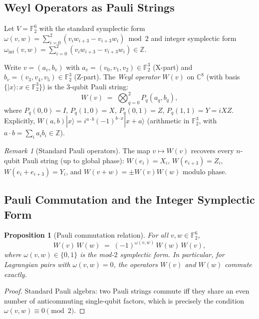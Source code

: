 \documentclass[11pt,a4paper]{article}
\newtheorem{proposition}[theorem]{Proposition}
\theoremstyle{remark}
\newtheorem{remark}[theorem]{Remark}
\begin{document}
\subsection{Weyl Operators as Pauli Strings}

Let $V = \mathbb{F}_2^6$ with the standard symplectic form
$\omega(v,w) = \sum_{i=0}^2 (v_i w_{i+3} - v_{i+3} w_i) \bmod 2$
and integer symplectic form
$\omega_{\mathrm{int}}(v,w) = \sum_{i=0}^2 (v_i w_{i+3} - v_{i+3} w_i) \in \mathbb{Z}$.

Write $v = (a_v, b_v)$ with $a_v = (v_0,v_1,v_2) \in \mathbb{F}_2^3$ (X-part)
and $b_v = (v_3,v_4,v_5) \in \mathbb{F}_2^3$ (Z-part).
The \emph{Weyl operator} $W(v)$ on $\mathbb{C}^8$
(with basis $\{|x\rangle : x \in \mathbb{F}_2^3\}$) is the
3-qubit Pauli string:
\[
  W(v) \;=\; \bigotimes_{q=0}^{2} P_q(a_q, b_q),
\]
where $P_q(0,0) = I$, $P_q(1,0) = X$, $P_q(0,1) = Z$,
$P_q(1,1) = Y = iXZ$.
Explicitly, $W(a,b)|x\rangle = i^{a \cdot b}(-1)^{b \cdot x}|x+a\rangle$
(arithmetic in $\mathbb{F}_2^3$, with $a \cdot b = \sum_i a_i b_i \in \mathbb{Z}$).

\begin{remark}[Standard Pauli operators]
The map $v \mapsto W(v)$ recovers every $n$-qubit Pauli string
(up to global phase):
$W(e_i) = X_i$, $W(e_{i+3}) = Z_i$, $W(e_i + e_{i+3}) = Y_i$,
and $W(v+w) = \pm W(v)W(w)$ modulo phase.
\end{remark}

\subsection{Pauli Commutation and the Integer Symplectic Form}

\begin{proposition}[Pauli commutation relation]\label{prop:weylcomm}
For all $v, w \in \mathbb{F}_2^6$,
\[
  W(v)\,W(w) \;=\; (-1)^{\omega(v,w)} \, W(w)\,W(v),
\]
where $\omega(v,w) \in \{0,1\}$ is the mod-$2$ symplectic form.
In particular, for Lagrangian pairs with $\omega(v,w) = 0$,
the operators $W(v)$ and $W(w)$ commute exactly.
\end{proposition}

\begin{proof}
Standard Pauli algebra: two Pauli strings commute iff they share an
even number of anticommuting single-qubit factors, which is precisely
the condition $\omega(v,w) \equiv 0 \pmod 2$.
\end{proof}
\end{document}
